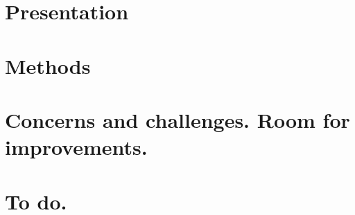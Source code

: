 \documentclass[11pt,a4paper]{report}
\begin{document}
\chapter{Presentation}



\chapter{Methods}



\chapter{Concerns and challenges. Room for improvements.}



\chapter{To do.}













\end{document}
